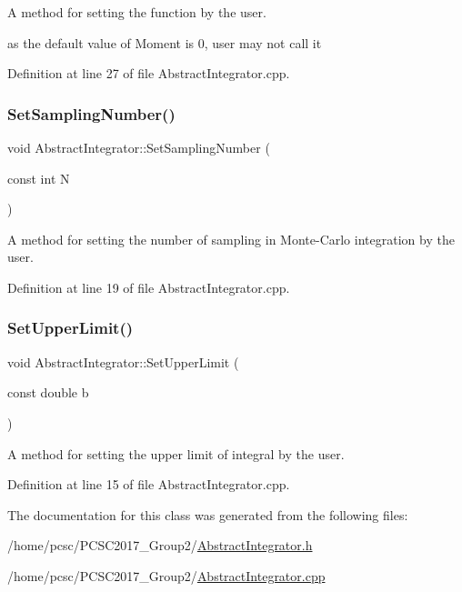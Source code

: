 A method for setting the function by the user. 

as the default value of Moment is 0, user may not call it 

Definition at line 27 of file Abstract\+Integrator.\+cpp.

\mbox{\label{class_abstract_integrator_a48c0b007c4b18e4a229f014bb0ccf9c0}} 
\subsubsection{\texorpdfstring{Set\+Sampling\+Number()}{SetSamplingNumber()}}
{\footnotesize\ttfamily void Abstract\+Integrator\+::\+Set\+Sampling\+Number (\begin{DoxyParamCaption}\item[{const int}]{N }\end{DoxyParamCaption})}



A method for setting the number of sampling in Monte-\/\+Carlo integration by the user. 



Definition at line 19 of file Abstract\+Integrator.\+cpp.

\mbox{\label{class_abstract_integrator_a341070bf2dca9e2ac113d388e6d06556}} 
\subsubsection{\texorpdfstring{Set\+Upper\+Limit()}{SetUpperLimit()}}
{\footnotesize\ttfamily void Abstract\+Integrator\+::\+Set\+Upper\+Limit (\begin{DoxyParamCaption}\item[{const double}]{b }\end{DoxyParamCaption})}



A method for setting the upper limit of integral by the user. 



Definition at line 15 of file Abstract\+Integrator.\+cpp.



The documentation for this class was generated from the following files\+:\begin{DoxyCompactItemize}
\item 
/home/pcsc/\+P\+C\+S\+C2017\+\_\+\+Group2/\hyperlink{_abstract_integrator_8h}{Abstract\+Integrator.\+h}\item 
/home/pcsc/\+P\+C\+S\+C2017\+\_\+\+Group2/\hyperlink{_abstract_integrator_8cpp}{Abstract\+Integrator.\+cpp}\end{DoxyCompactItemize}
